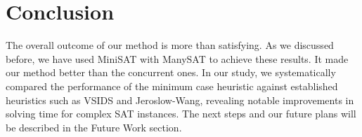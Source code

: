 \documentclass{article}
\begin{document}
\section{Conclusion}
The overall outcome of our method is more than satisfying.  As we discussed before, we have used MiniSAT with ManySAT to achieve these results. It made our method better than the concurrent ones. In our study, we systematically compared the performance of the minimum case heuristic against established heuristics such as VSIDS and Jeroslow-Wang, revealing notable improvements in solving time for complex SAT instances. The next steps and our future plans will be described in the Future Work section.
\end{document}
